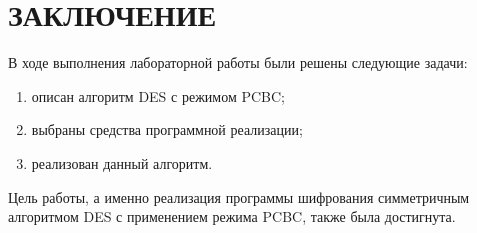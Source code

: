 \chapter*{ЗАКЛЮЧЕНИЕ}

В ходе выполнения лабораторной работы были решены следующие задачи:

\begin{enumerate}[label={\arabic*)}]
	\item описан алгоритм DES с режимом PCBC;
	\item выбраны средства программной реализации;
	\item реализован данный алгоритм.
\end{enumerate}

Цель работы, а именно реализация программы шифрования симметричным алгоритмом DES с применением режима PCBC, также была достигнута.

